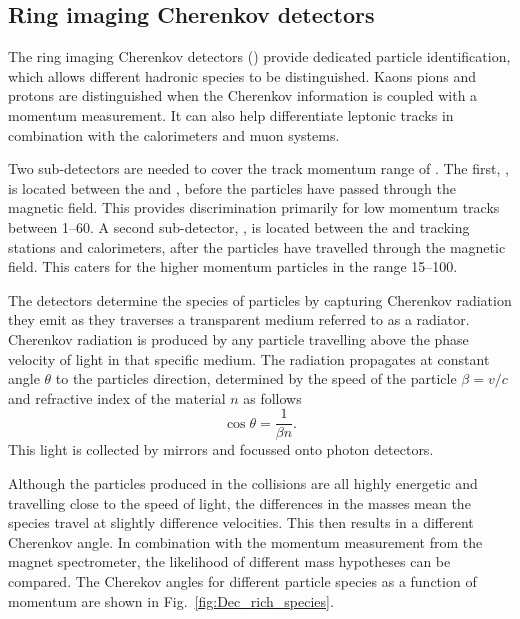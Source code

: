 

\subsection{Ring imaging Cherenkov detectors}
\label{sec:Dec_RICH}
The ring imaging Cherenkov detectors (\rich) provide dedicated particle identification, which allows different hadronic species to be distinguished.
Kaons pions and protons are distinguished when the Cherenkov information is coupled with a momentum measurement. It can also help differentiate leptonic tracks in combination with the calorimeters and muon systems. 

Two \rich sub-detectors are needed to cover the track momentum range of \lhcb. The first, \richone, is located between the \velo and \ttracker, before the particles have passed through the magnetic field. This provides discrimination primarily for low momentum tracks between 1--60\gevc. A second sub-detector, \richtwo, is located between the \intr and \ot tracking stations and calorimeters, after the particles have travelled through the magnetic field. This caters for the higher momentum particles in the range 15--100\gevc. 

The \rich detectors determine the species of particles by capturing Cherenkov radiation they emit as they traverses a transparent medium referred to as a radiator. Cherenkov radiation is produced by any particle travelling above the phase velocity of light in that specific medium. The radiation propagates at constant angle $\theta$ to the particles direction, determined by the speed of the particle $\beta = v/c$ and refractive index of the material $n$ as follows
\begin{equation}
\cos{\theta} = \frac{1}{\beta n}.
\end{equation}
This light is collected by mirrors and focussed onto photon detectors. 

Although the particles produced in the collisions are all highly energetic and travelling close to the speed of light, the differences in the masses mean the species travel at slightly difference velocities. This then results in a different Cherenkov angle. In combination with the momentum measurement from the magnet spectrometer, the likelihood of different mass hypotheses can be compared. The Cherekov angles for different particle species as a function of momentum are shown in Fig.~\ref{fig:Dec_rich_species}. 



